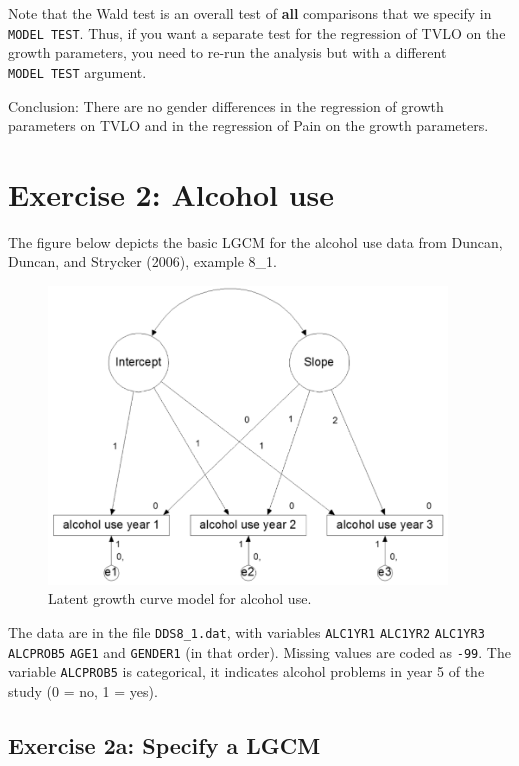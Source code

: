 \documentclass[
]{book}
\begin{document}
Note that the Wald test is an overall test of \textbf{all} comparisons that we specify in \texttt{MODEL\ TEST}. Thus, if you want a separate test for the regression of TVLO on the growth parameters, you need to re-run the analysis but with a different \texttt{MODEL\ TEST} argument.

Conclusion: There are no gender differences in the regression of growth parameters on TVLO and in the regression of Pain on the growth parameters.

\hypertarget{exercise-2-alcohol-use}{%
\section{Exercise 2: Alcohol use}\label{exercise-2-alcohol-use}}

The figure below depicts the basic LGCM for the alcohol use data from Duncan, Duncan, and Strycker (2006), example 8\_1.

\begin{figure}
\centering
\includegraphics[width=4.16667in,height=\textheight]{./figures/Duncan-LGCM.png}
\caption{Latent growth curve model for alcohol use.}
\end{figure}

The data are in the file \texttt{DDS8\_1.dat}, with variables \texttt{ALC1YR1} \texttt{ALC1YR2} \texttt{ALC1YR3} \texttt{ALCPROB5} \texttt{AGE1} and \texttt{GENDER1} (in that order). Missing values are coded as \texttt{-99}. The variable \texttt{ALCPROB5} is categorical, it indicates alcohol problems in year 5 of the study (0 = no, 1 = yes).

\hypertarget{exercise-2a-specify-a-lgcm}{%
\subsection{Exercise 2a: Specify a LGCM}\label{exercise-2a-specify-a-lgcm}}
\end{document}
